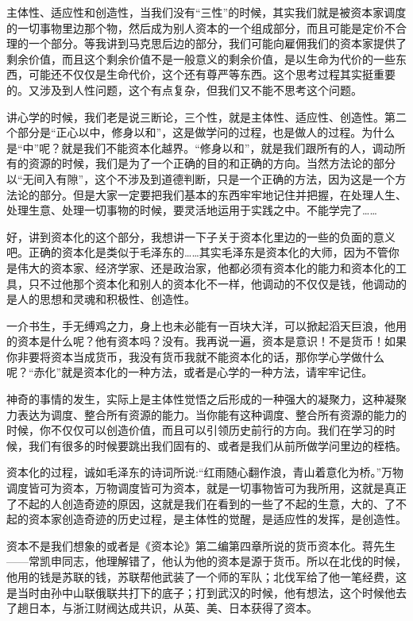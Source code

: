 \documentclass[UTF8, 12pt, a4paper]{ctexrep}
\begin{document}
主体性、适应性和创造性，当我们没有“三性”的时候，其实我们就是被资本家调度的一切事物里边那个物，然后成为别人资本的一个组成部分，而且可能是定价不合理的一个部分。等我讲到马克思后边的部分，我们可能向雇佣我们的资本家提供了剩余价值，而且这个剩余价值不是一般意义的剩余价值，是以生命为代价的一些东西，可能还不仅仅是生命代价，这个还有尊严等东西。这个思考过程其实挺重要的。又涉及到人性问题，这个有点复杂，但我们又不能不思考这个问题。

讲心学的时候，我们老是说三断论，三个性，就是主体性、适应性、创造性。第二个部分是“正心以中，修身以和”，这是做学问的过程，也是做人的过程。为什么是“中”呢？就是我们不能资本化越界。“修身以和”，就是我们跟所有的人，调动所有的资源的时候，我们是为了一个正确的目的和正确的方向。当然方法论的部分以“无间入有隙”，这个不涉及到道德判断，只是一个正确的方法，因为这是一个方法论的部分。但是大家一定要把我们基本的东西牢牢地记住并把握，在处理人生、处理生意、处理一切事物的时候，要灵活地运用于实践之中。不能学完了……

好，讲到资本化的这个部分，我想讲一下子关于资本化里边的一些的负面的意义吧。正确的资本化是类似于毛泽东的……其实毛泽东是资本化的大师，因为不管你是伟大的资本家、经济学家、还是政治家，他都必须有资本化的能力和资本化的工具，只不过他那个资本化和别人的资本化不一样，他调动的不仅仅是钱，他调动的是人的思想和灵魂和积极性、创造性。

一介书生，手无缚鸡之力，身上也未必能有一百块大洋，可以掀起滔天巨浪，他用的资本是什么呢？他有资本吗？没有。我再说一遍，资本是意识！不是货币！如果你非要将资本当成货币，我没有货币我就不能资本化的话，那你学心学做什么呢？“赤化”就是资本化的一种方法，或者是心学的一种方法，请牢牢记住。

神奇的事情的发生，实际上是主体性觉悟之后形成的一种强大的凝聚力，这种凝聚力表达为调度、整合所有资源的能力。当你能有这种调度、整合所有资源的能力的时候，你不仅仅可以创造价值，而且可以引领历史前行的方向。我们在学习的时候，我们有很多的时候要跳出我们固有的、或者是我们从前所做学问里边的桎梏。

资本化的过程，诚如毛泽东的诗词所说:“红雨随心翻作浪，青山着意化为桥。”万物调度皆可为资本，万物调度皆可为资本，就是一切事物皆可为我所用，这就是真正了不起的人创造奇迹的原因，这就是我们在看到的一些了不起的生意，大的、了不起的资本家创造奇迹的历史过程，是主体性的觉醒，是适应性的发挥，是创造性。

资本不是我们想象的或者是《资本论》第二编第四章所说的货币资本化。蒋先生——常凯申同志，他理解错了，他认为他的资本是源于货币。所以在北伐的时候，他用的钱是苏联的钱，苏联帮他武装了一个师的军队；北伐军给了他一笔经费，这是当时由孙中山联俄联共打下的底子；打到武汉的时候，他有想法，这个时候他去了趟日本，与浙江财阀达成共识，从英、美、日本获得了资本。
\end{document}
